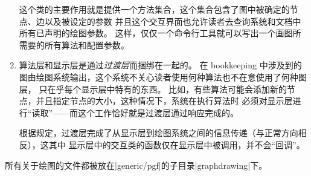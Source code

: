 \begin{enumerate}
这个类的主要作用就是提供一个方法集合，这个集合包含了图中被确定的节点、边以及被设定的参数
并且这个交互界面也允许读者去查询系统和文档中所有已声明的绘图参数。
这样，仅仅一个命令行工具就可以写出一个画图所需要的所有算法和配置参数。
\item
算法层和显示层是通过\emph{过渡层}而捆绑在一起的。
在 bookkeeping 中涉及到的图由绘图系统输出，这个系统不关心读者使用何种算法也不在意使用了何种图层，
只在乎每个显示层中特有的东西。
比如，有些算法可能会添加新的节点，并且指定节点的大小，这种情况下，系统在执行算法时
必须对显示层进行“读取”——而这个工作恰好就是过渡层通过响应完成的。
  
根据规定，过渡层完成了从显示层到绘图系统之间的信息传递（与正常方向相反），这其中
显示层中的交互类的函数仅在显示层中被调用，并不会“回调”。
\end{enumerate}

所有关于绘图的文件都被放在|generic/pgf|的子目录|graphdrawing|下。

